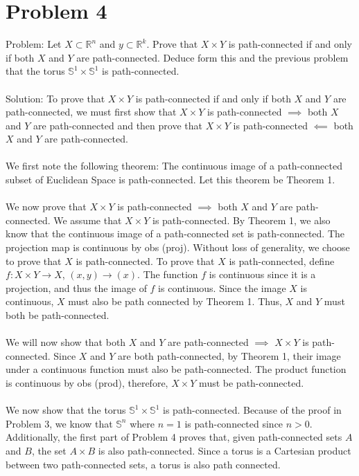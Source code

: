 \documentclass{article}
\begin{document}
\newpage

\section*{Problem 4}

Problem: Let $X \subset \mathbb{R}^n$ and $y \subset \mathbb{R}^k$. Prove that $X \times Y$ is path-connected if and only if both $X$ and $Y$ are path-connected. Deduce form this and the previous problem that the torus $\mathbb{S}^1 \times \mathbb{S}^1$ is path-connected. \\\\
Solution: To prove that $X \times Y$ is path-connected if and only if both $X$ and $Y$ are path-connected, we must first show that $X \times Y$ is path-connected $\implies$ both $X$ and $Y$ are path-connected and then prove that $X \times Y$ is path-connected $\impliedby$ both $X$ and $Y$ are path-connected. \\\\
We first note the following theorem: The continuous image of a path-connected subset of Euclidean Space is path-connected. Let this theorem be Theorem 1. \\\\
We now prove that $X \times Y$ is path-connected $\implies$ both $X$ and $Y$ are path-connected. We assume that $X \times Y$ is path-connected. By Theorem 1, we also know that the continuous image of a path-connected set is path-connected. The projection map is continuous by obs (proj). Without loss of generality, we choose to prove that $X$ is path-connected. To prove that $X$ is path-connected, define $f:X \times Y \to X$, $(x,y) \to (x)$. The function $f$ is continuous since it is a projection, and thus the image of $f$ is continuous. Since the image $X$ is continuous, $X$ must also be path connected by Theorem 1. Thus, $X$ and $Y$ must both be path-connected. \\\\
We will now show that both $X$ and $Y$ are path-connected $\implies$ $X \times Y$ is path-connected. Since $X$ and $Y$ are both path-connected, by Theorem 1, their image under a continuous function must also be path-connected. The product function is continuous by obs (prod), therefore, $X \times Y$ must be path-connected. \\\\
We now show that the torus $\mathbb{S}^1 \times \mathbb{S}^1$ is path-connected. Because of the proof in Problem 3, we know that $\mathbb{S}^n$ where $n=1$ is path-connected since $n > 0$. Additionally, the first part of Problem 4 proves that, given path-connected sets $A$ and $B$, the set $A \times B$ is also path-connected. Since a torus is a Cartesian product between two path-connected sets, a torus is also path connected.
\end{document}
